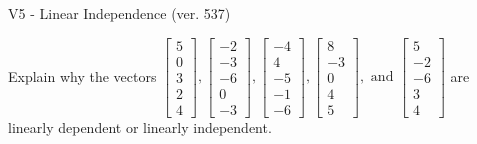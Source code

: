 \begin{exercise}
  \begin{exerciseTitle}V5 - Linear Independence (ver. 537)\end{exerciseTitle}
  \begin{exerciseStatement}
    Explain why the vectors \(\left[\begin{array}{r}
5 \\
0 \\
3 \\
2 \\
4
\end{array}\right] , \left[\begin{array}{r}
-2 \\
-3 \\
-6 \\
0 \\
-3
\end{array}\right] , \left[\begin{array}{r}
-4 \\
4 \\
-5 \\
-1 \\
-6
\end{array}\right] , \left[\begin{array}{r}
8 \\
-3 \\
0 \\
4 \\
5
\end{array}\right] , \text{ and } \left[\begin{array}{r}
5 \\
-2 \\
-6 \\
3 \\
4
\end{array}\right]\) are linearly dependent or linearly independent.	



\end{exerciseStatement}
\end{exercise}
